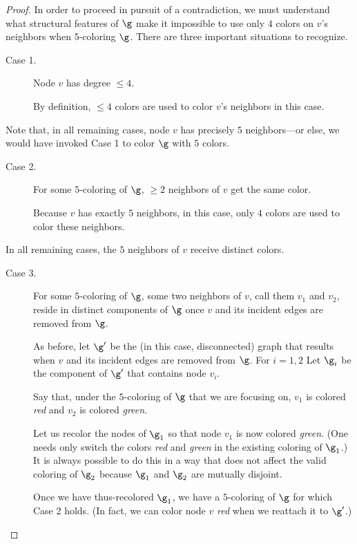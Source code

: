 \begin{proof}
In order to proceed in pursuit of a contradiction, we must understand
what structural features of $\g$ make it impossible to use only $4$
colors on $v$'s neighbors when $5$-coloring $\g$.  There are three
important situations to recognize.
\begin{description}
\item[{\sf Case 1}.]
Node $v$ has degree $\leq 4$.

\smallskip

By definition, $\leq 4$ colors are used to color $v$'s neighbors in
this case.
\end{description}
Note that, in all remaining cases, node $v$ has precisely $5$
neighbors---or else, we would have invoked Case 1 to color $\g$ with
$5$ colors.
\begin{description}
\item[{\sf Case 2}.]
For some $5$-coloring of $\g$, $\geq 2$ neighbors of $v$ get the same
color.

\smallskip

Because $v$ has exactly $5$ neighbors, in this case, only $4$ colors
are used to color these neighbors.
\end{description}
In all remaining cases, the $5$ neighbors of $v$ receive distinct
colors.
\begin{description}
\item[{\sf Case 3}.]
For some $5$-coloring of $\g$, some two neighbors of $v$, call them
$v_1$ and $v_2$, reside in distinct components of $\g$ once $v$ and
its incident edges are removed from $\g$.

\smallskip

As before, let $\g'$ be the (in this case, disconnected) graph that
results when $v$ and its incident edges are removed from $\g$.  For $i
= 1,2$ Let $\g_i$ be the component of $\g'$ that contains node $v_i$.

Say that, under the $5$-coloring of $\g$ that we are focusing on,
$v_1$ is colored {\it red} and $v_2$ is colored {\it green}.

Let us recolor the nodes of $\g_1$ so that node $v_1$ is now colored
{\it green}.  (One needs only switch the colors {\it red} and {\it
  green} in the existing coloring of $\g_1$.)  It is always possible
to do this in a way that does not affect the valid coloring of $\g_2$
because $\g_1$ and $\g_2$ are mutually disjoint.

Once we have thus-recolored $\g_1$, we have a $5$-coloring of $\g$ for
which Case 2 holds.  (In fact, we can color node $v$ {\em red} when we
reattach it to $\g'$.)
\end{description}


\end{proof}
